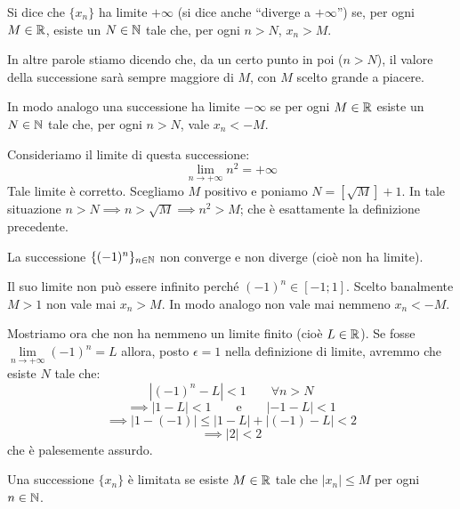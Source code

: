 \begin{definition}
Si dice che $\{x_n\}$ ha limite $+\infty$ (si dice anche ``diverge a $+\infty$'') se, per ogni $M \in \mathbb R$, esiste un $N \in \mathbb N$ tale che, per ogni $n > N$, $x_n > M$.
\end{definition}

In altre parole stiamo dicendo che, da un certo punto in poi ($n > N$), il valore della successione sarà sempre maggiore di $M$, con $M$ scelto grande a piacere.

In modo analogo una successione ha limite $-\infty$ se per ogni $M \in \mathbb R$ esiste un $N \in \mathbb N$ tale che, per ogni $n > N$, vale $x_n < -M$.

\begin{example}
Consideriamo il limite di questa successione:
\begin{equation*}
\lim_{n \to +\infty} n^2 = +\infty
\end{equation*}
Tale limite è corretto. Scegliamo $M$ positivo e poniamo $N = [\sqrt{M}] + 1$. In tale situazione $n > N \implies n > \sqrt{M} \implies n^2 > M$; che è esattamente la definizione precedente.
\end{example}

\begin{example}
La successione $\{(-1)^n\}_{n \in \mathbb N}$ non converge e non diverge (cioè non ha limite).

Il suo limite non può essere infinito perché $(-1)^n \in [-1; 1]$. Scelto banalmente $M > 1$ non vale mai $x_n > M$. In modo analogo non vale mai nemmeno $x_n < -M$.

Mostriamo ora che non ha nemmeno un limite finito (cioè $L \in \mathbb R$). Se fosse $\lim\limits_{n \to +\infty} (-1)^n = L$ allora, posto $\epsilon = 1$ nella definizione di limite, avremmo che esiste $N$ tale che:
\begin{equation*}
| (-1)^n - L | < 1 \qquad \forall n > N
\end{equation*}
\begin{equation*}
\implies |1 - L| < 1 \qquad \text{e} \qquad |-1 - L| < 1
\end{equation*}
\begin{equation*}
\implies |1 - (-1)| \le |1 - L| + |(-1)-L| < 2
\end{equation*}
\begin{equation*}
\implies |2| < 2
\end{equation*}
che è palesemente assurdo.
\end{example}

\begin{definition}
Una successione $\{x_n\}$ è limitata se esiste $M \in \mathbb R$ tale che $|x_n| \le M$ per ogni $n \in \mathbb N$.
\end{definition}

